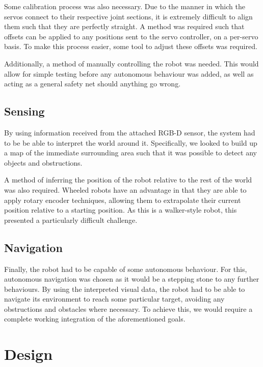 Some calibration process was also necessary. Due to the manner in which the servos connect to their respective joint sections, it is extremely difficult to align them such that they are perfectly straight. A method was required such that offsets can be applied to any positions sent to the servo controller, on a per-servo basis. To make this process easier, some tool to adjust these offsets was required.

Additionally, a method of manually controlling the robot was needed. This would allow for simple testing before any autonomous behaviour was added, as well as acting as a general safety net should anything go wrong.

\subsection{Sensing}

By using information received from the attached RGB-D sensor, the system had to be be able to interpret the world around it. Specifically, we looked to build up a map of the immediate surrounding area such that it was possible to detect any objects and obstructions.

A method of inferring the position of the robot relative to the rest of the world was also required. Wheeled robots have an advantage in that they are able to apply rotary encoder techniques, allowing them to extrapolate their current position relative to a starting position. As this is a walker-style robot, this presented a particularly difficult challenge.

\subsection{Navigation}

Finally, the robot had to be capable of some autonomous behaviour. For this, autonomous navigation was chosen as it would be a stepping stone to any further behaviours. By using the interpreted visual data, the robot had to be able to navigate its environment to reach some particular target, avoiding any obstructions and obstacles where necessary. To achieve this, we would require a complete working integration of the aforementioned goals.


\section{Design}